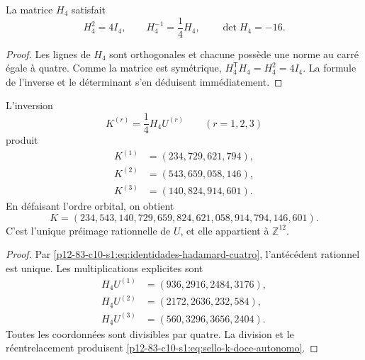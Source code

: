 \begin{lemma}
\label{p12-83-c10-s1:lem:cuarto-inversa-hadamard}
La matrice \(H_4\) satisfait
\begin{equation}
 H_4^2=4I_4,
 \qquad
 H_4^{-1}=\frac14H_4,
 \qquad
 \det H_4=-16.
 \label{p12-83-c10-s1:eq:identidades-hadamard-cuatro}
\end{equation}
\end{lemma}

\begin{proof}
Les lignes de \(H_4\) sont orthogonales et chacune possède une norme au carré égale à quatre.
Comme la matrice est symétrique, \(H_4^{\mathsf T}H_4=H_4^2=4I_4\). La
formule de l’inverse et le déterminant s’en déduisent immédiatement.
\end{proof}

\begin{theorem}
\label{p12-83-c10-s1:thm:reconstruccion-entera-k-hadamard}
L’inversion
\begin{equation}
 K^{(r)}=\frac14H_4U^{(r)}
 \qquad(r=1,2,3)
 \label{p12-83-c10-s1:eq:inversion-bloques-hadamard}
\end{equation}
produit
\begin{align*}
 K^{(1)}&=(234,729,621,794),\\
 K^{(2)}&=(543,659,058,146),\\
 K^{(3)}&=(140,824,914,601).
\end{align*}
En défaisant l’ordre orbital, on obtient
\begin{equation}
 \boxed{
 K=(234,543,140,729,659,824,621,058,914,794,146,601).}
 \label{p12-83-c10-s1:eq:sello-k-doce-autonomo}
\end{equation}
C'est l'unique préimage rationnelle de \(U\), et elle appartient à \(\mathbb Z^{12}\).
\end{theorem}

\begin{proof}
Par \eqref{p12-83-c10-s1:eq:identidades-hadamard-cuatro}, l’antécédent rationnel est unique.
Les multiplications explicites sont
\begin{align*}
 H_4U^{(1)}&=(936,2916,2484,3176),\\
 H_4U^{(2)}&=(2172,2636,232,584),\\
 H_4U^{(3)}&=(560,3296,3656,2404).
\end{align*}
Toutes les coordonnées sont divisibles par quatre. La division et le réentrelacement
produisent \eqref{p12-83-c10-s1:eq:sello-k-doce-autonomo}.
\end{proof}

